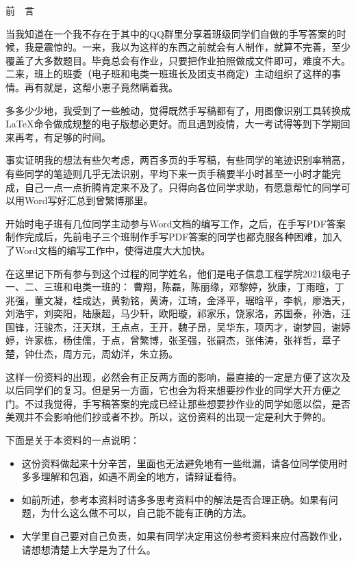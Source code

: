 \documentclass{article}
\begin{document}
	\newpage
	\begin{center}
		前~~言
	\end{center}

	当我知道在一个我不存在于其中的QQ群里分享着班级同学们自做的手写答案的时候，我是震惊的。一来，我以为这样的东西之前就会有人制作，就算不完善，至少覆盖了大多数题目。毕竟总会有作业，只要把作业拍照做成文件即可，难度不大。二来，班上的班委（电子班和电类一班班长及团支书商定）主动组织了这样的事情。再有就是，这帮小崽子竟然瞒着我。
	
	多多少少地，我受到了一些触动，觉得既然手写稿都有了，用图像识别工具转换成\LaTeX 命令做成规整的电子版想必更好。而且遇到疫情，大一考试得等到下学期回来再考，有足够的时间。
	
	事实证明我的想法有些欠考虑，两百多页的手写稿，有些同学的笔迹识别率稍高，有些同学的笔迹则几乎无法识别，平均下来一页手稿要半小时甚至一小时才能完成，自己一点一点折腾肯定来不及了。只得向各位同学求助，有愿意帮忙的同学可以用Word写好汇总到曾繁博那里。
	
	开始时电子班有几位同学主动参与Word文档的编写工作，之后，在手写PDF答案制作完成后，先前电子三个班制作手写PDF答案的同学也都克服各种困难，加入了Word文档的编写工作中，使得进度大大加快。
	
	在这里记下所有参与到这个过程的同学姓名，他们是电子信息工程学院2021级电子一、二、三班和电类一班的：
	曹翔，陈磊，陈丽缘，邓黎婷，狄康，丁雨暄，丁兆强，董文凝，桂成达，黄勃铭，黄涛，江琦，金泽平，琚晗平，李帆，廖浩天，刘浩宇，刘奕阳，陆康超，马少轩，欧阳璇，祁家乐，饶家洛，苏国泰，孙浩，汪国锋，汪骏杰，汪天琪，王点点，王开，魏子昂，吴华东，项丙才，谢梦园，谢婷婷，许家栋，杨佳儒，于点，曾繁博，张圣强，张嗣杰，张伟涛，张祥哲，章子楚，钟仕杰，周方元，周幼洋，朱立扬。
	
	这样一份资料的出现，必然会有正反两方面的影响，最直接的一定是方便了这次及以后同学们的复习。但是另一方面，它也会为将来想要抄作业的同学大开方便之门。不过我觉得，手写稿答案的完成已经让那些想要抄作业的同学如愿以偿，是否美观并不会影响他们抄或者不抄。所以，这份资料的出现一定是利大于弊的。
	
	下面是关于本资料的一点说明：
	
	\begin{itemize}
		\item 这份资料做起来十分辛苦，里面也无法避免地有一些纰漏，请各位同学使用时多多理解和包涵，如遇不周全的地方，请辩证看待。
		\item 如前所述，参考本资料时请多多思考资料中的解法是否合理正确。如果有问题，为什么这么做不可以，自己能不能有正确的方法。
		\item 大学里自己要对自己负责，如果有同学决定用这份参考资料来应付高数作业，请想想清楚上大学是为了什么。
	\end{itemize}
	
\end{document}
